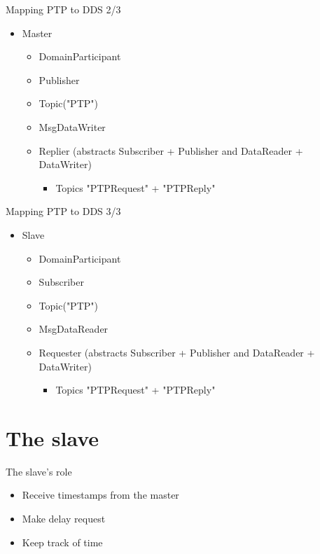 \documentclass[compressed, presentation, notheorems, 12pt]{beamer}
\begin{document}
\begin{frame}{Mapping PTP to DDS 2/3}
\begin{itemize}
	\item Master
	\begin{itemize}
		\item DomainParticipant
		\item  Publisher
		\item Topic("PTP")
		\item MsgDataWriter
		\item Replier (abstracts Subscriber + Publisher and DataReader + DataWriter)
		\begin{itemize}
			\item  Topics "PTPRequest" + "PTPReply"
		\end{itemize}
	\end{itemize}
\end{itemize}
\end{frame}



\begin{frame}{Mapping PTP to DDS 3/3}
\begin{itemize}
	\item Slave
	\begin{itemize}
		\item DomainParticipant
		\item  Subscriber
		\item Topic("PTP")
		\item MsgDataReader
		\item Requester (abstracts Subscriber + Publisher and DataReader + DataWriter)
		\begin{itemize}
			\item  Topics "PTPRequest" + "PTPReply"
		\end{itemize}
	\end{itemize}
\end{itemize}
\end{frame}
	
\section{The slave}
	\begin{frame}{The slave's role}	

	\begin{itemize}
		\item Receive timestamps from the master
		\item Make delay request
		\item Keep track of time
	\end{itemize}
	
	\end{frame}
\end{document}
